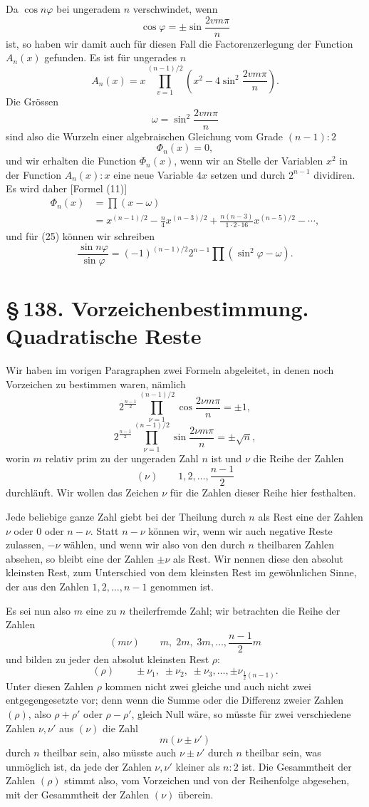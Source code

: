 \documentclass[11pt]{article}
\providecommand{\sect}[2]{\section*{\S\,#1. #2}}
\begin{document}
Da $\cos n\varphi$ bei ungeradem $n$ verschwindet, wenn
\[
        \cos\varphi=\pm\sin\frac{2vm\pi}{n}
\]
ist, so haben wir damit auch für diesen Fall die Factorenzerlegung der Function $A_n(x)$ gefunden. Es ist für ungerades $n$
\[
\tag{26}       A_n(x)=x\prod_{v=1}^{(n-1)/2}
\left(x^2-4\sin^2\frac{2vm\pi}{n}\right).
\]
Die Grössen
\[
\tag{27}       \omega=\sin^2\frac{2vm\pi}{n}
\]
sind also die Wurzeln einer algebraischen Gleichung vom Grade $(n-1):2$
\[
        \Phi_n(x)=0,
\]
und wir erhalten die Function $\Phi_n(x)$, wenn wir an Stelle der Variablen $x^2$ in der Function $A_n(x):x$ eine neue Variable $4x$ setzen und durch $2^{n-1}$ dividiren. Es wird daher [Formel (11)]
\[
\tag{28}\begin{aligned}
\Phi_n(x)&=\prod(x-\omega)\\
&=x^{(n-1)/2}-\frac n4 x^{(n-3)/2}
+\frac{n(n-3)}{1\cdot2\cdot16}x^{(n-5)/2}-\cdots,
\end{aligned}
\]
und für (25) können wir schreiben
\[
\tag{29}       \frac{\sin n\varphi}{\sin\varphi}
=(-1)^{(n-1)/2}2^{n-1}\prod(\sin^2\varphi-\omega).
\]


\sect{138}{Vorzeichenbestimmung. Quadratische Reste}

Wir haben im vorigen Paragraphen zwei Formeln abgeleitet, in denen noch Vorzeichen zu bestimmen waren, nämlich
\[
\tag{1}
2^{\frac{n-1}{2}}\prod_{\nu=1}^{(n-1)/2}\cos\frac{2\nu m\pi}{n}=\pm1,
\]
\[
\tag{2}
2^{\frac{n-1}{2}}\prod_{\nu=1}^{(n-1)/2}\sin\frac{2\nu m\pi}{n}=\pm\sqrt n,
\]
worin $m$ relativ prim zu der ungeraden Zahl $n$ ist und $\nu$ die Reihe der Zahlen
\[
(\nu)\qquad 1,2,\ldots,\frac{n-1}{2}
\]
durchläuft. Wir wollen das Zeichen $\nu$ für die Zahlen dieser Reihe hier festhalten.

Jede beliebige ganze Zahl giebt bei der Theilung durch $n$ als Rest eine der Zahlen $\nu$ oder $0$ oder $n-\nu$. Statt $n-\nu$ können wir, wenn wir auch negative Reste zulassen, $-\nu$ wählen, und wenn wir also von den durch $n$ theilbaren Zahlen absehen, so bleibt eine der Zahlen $\pm\nu$ als Rest. Wir nennen diese den absolut kleinsten Rest, zum Unterschied von dem kleinsten Rest im gewöhnlichen Sinne, der aus den Zahlen $1,2,\ldots,n-1$ genommen ist.

Es sei nun also $m$ eine zu $n$ theilerfremde Zahl; wir betrachten die Reihe der Zahlen
\[
(m\nu)\qquad m,\;2m,\;3m,\ldots,\frac{n-1}{2}m
\]
und bilden zu jeder den absolut kleinsten Rest $\rho$:
\[
(\rho)\qquad \pm\nu_1,\;\pm\nu_2,\;\pm\nu_3,\ldots,
       \pm\nu_{\frac12(n-1)}.
\]
Unter diesen Zahlen $\rho$ kommen nicht zwei gleiche und auch nicht zwei entgegengesetzte vor; denn wenn die Summe oder die Differenz zweier Zahlen $(\rho)$, also $\rho+\rho'$ oder $\rho-\rho'$, gleich Null wäre, so müsste für zwei verschiedene Zahlen $\nu,\nu'$ aus $(\nu)$ die Zahl
\[
        m(\nu\pm\nu')
\]
durch $n$ theilbar sein, also müsste auch $\nu\pm\nu'$ durch $n$ theilbar sein, was unmöglich ist, da jede der Zahlen $\nu,\nu'$ kleiner als $n:2$ ist. Die Gesammtheit der Zahlen $(\rho)$ stimmt also, vom Vorzeichen und von der Reihenfolge abgesehen, mit der Gesammtheit der Zahlen $(\nu)$ überein.
\end{document}
